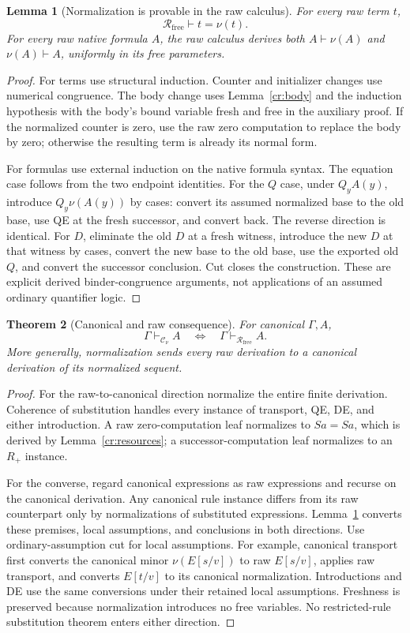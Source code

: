 \documentclass[11pt]{article}
\newtheorem{theorem}{Theorem}[section]
\newtheorem{lemma}[theorem]{Lemma}
\theoremstyle{definition}
\newcommand{\norm}[1]{\nu(#1)}
\newcommand{\Rfree}{\mathcal R_{\mathrm{free}}}
\newcommand{\Cnorm}{\mathcal C_\nu}
\begin{document}
\begin{lemma}[Normalization is provable in the raw calculus]\label{cr:normal-eq}
For every raw term \(t\),
\[
\Rfree\vdash t=\norm t.
\]
For every raw native formula \(A\), the raw calculus derives both
\(A\vdash\norm A\) and \(\norm A\vdash A\), uniformly in its free parameters.
\end{lemma}
\begin{proof}
For terms use structural induction. Counter and initializer changes use numerical congruence. The body change uses Lemma~\ref{cr:body} and the induction hypothesis with the body's bound variable fresh and free in the auxiliary proof. If the normalized counter is zero, use the raw zero computation to replace the body by zero; otherwise the resulting term is already its normal form.

For formulas use external induction on the native formula syntax. The equation case follows from the two endpoint identities. For the \(Q\) case, under \(Q_yA(y)\), introduce \(Q_y\norm{A(y)}\) by cases: convert its assumed normalized base to the old base, use QE at the fresh successor, and convert back. The reverse direction is identical. For \(D\), eliminate the old \(D\) at a fresh witness, introduce the new \(D\) at that witness by cases, convert the new base to the old base, use the exported old \(Q\), and convert the successor conclusion. Cut closes the construction. These are explicit derived binder-congruence arguments, not applications of an assumed ordinary quantifier logic.
\end{proof}

\begin{theorem}[Canonical and raw consequence]\label{cr:canonical-equiv}
For canonical \(\Gamma,A\),
\[
\Gamma\vdash_{\Cnorm}A
\quad\Longleftrightarrow\quad
\Gamma\vdash_{\Rfree}A.
\]
More generally, normalization sends every raw derivation to a canonical derivation of its normalized sequent.
\end{theorem}
\begin{proof}
For the raw-to-canonical direction normalize the entire finite derivation. Coherence of substitution handles every instance of transport, QE, DE, and either introduction. A raw zero-computation leaf normalizes to \(Sa=Sa\), which is derived by Lemma~\ref{cr:resources}; a successor-computation leaf normalizes to an \(R_+\) instance.

For the converse, regard canonical expressions as raw expressions and recurse on the canonical derivation. Any canonical rule instance differs from its raw counterpart only by normalizations of substituted expressions. Lemma~\ref{cr:normal-eq} converts these premises, local assumptions, and conclusions in both directions. Use ordinary-assumption cut for local assumptions. For example, canonical transport first converts the canonical minor \(\nu(E[s/v])\) to raw \(E[s/v]\), applies raw transport, and converts \(E[t/v]\) to its canonical normalization. Introductions and DE use the same conversions under their retained local assumptions. Freshness is preserved because normalization introduces no free variables. No restricted-rule substitution theorem enters either direction.
\end{proof}
\end{document}
